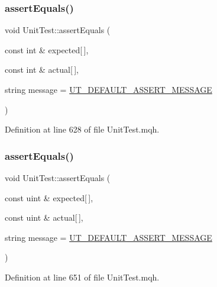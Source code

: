 \subsubsection{\texorpdfstring{assert\+Equals()}{assertEquals()}\hspace{0.1cm}{\footnotesize\ttfamily [20/28]}}
{\footnotesize\ttfamily void Unit\+Test\+::assert\+Equals (\begin{DoxyParamCaption}\item[{const int \&}]{expected\mbox{[}$\,$\mbox{]},  }\item[{const int \&}]{actual\mbox{[}$\,$\mbox{]},  }\item[{string}]{message = {\ttfamily \mbox{\hyperlink{_unit_test_8mqh_a96f5d62188d09039ebc3f443c9120e39}{U\+T\+\_\+\+D\+E\+F\+A\+U\+L\+T\+\_\+\+A\+S\+S\+E\+R\+T\+\_\+\+M\+E\+S\+S\+A\+GE}}} }\end{DoxyParamCaption})}



Definition at line 628 of file Unit\+Test.\+mqh.

\mbox{\label{class_unit_test_a3b9131dd355b18a6c7f9be1bad520f6d}} 
\subsubsection{\texorpdfstring{assert\+Equals()}{assertEquals()}\hspace{0.1cm}{\footnotesize\ttfamily [21/28]}}
{\footnotesize\ttfamily void Unit\+Test\+::assert\+Equals (\begin{DoxyParamCaption}\item[{const uint \&}]{expected\mbox{[}$\,$\mbox{]},  }\item[{const uint \&}]{actual\mbox{[}$\,$\mbox{]},  }\item[{string}]{message = {\ttfamily \mbox{\hyperlink{_unit_test_8mqh_a96f5d62188d09039ebc3f443c9120e39}{U\+T\+\_\+\+D\+E\+F\+A\+U\+L\+T\+\_\+\+A\+S\+S\+E\+R\+T\+\_\+\+M\+E\+S\+S\+A\+GE}}} }\end{DoxyParamCaption})}



Definition at line 651 of file Unit\+Test.\+mqh.

\mbox{\label{class_unit_test_a152eec7edfa6f9cd93143dbe5895b878}} 
